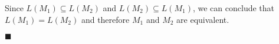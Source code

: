 \documentclass[a4paper]{exam}
\begin{document}
\begin{questions}
\begin{solution}
Since $ L(M_1) \subseteq L(M_2) $ and $ L(M_2) \subseteq L(M_1) $, we can conclude that $ L(M_1) = L(M_2) $ and therefore $M_1$ and $M_2$ are equivalent. \vspace*{-2mm}
\begin{flushright}
  $\blacksquare$
\end{flushright}

\end{solution}

\end{questions}
\end{document}
